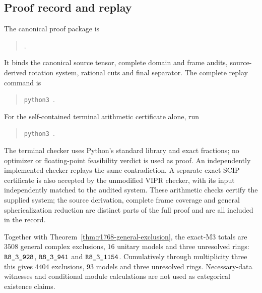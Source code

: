 \subsection{Proof record and replay}
The canonical proof package is
\begin{quote}\small{}.\end{quote}
It binds the canonical source tensor, complete domain and frame audits,
source-derived rotation system, rational cuts and final separator.
The complete replay command is
\begin{quote}\small
\texttt{python3 }.
\end{quote}
For the self-contained terminal arithmetic certificate alone, run
\begin{quote}\small
\texttt{python3 }.
\end{quote}
The terminal checker uses Python's standard library and exact fractions;
no optimizer or floating-point feasibility verdict is used as proof.
An independently implemented checker replays the same contradiction.
A separate exact SCIP certificate is also accepted by the unmodified
VIPR checker, with its input independently matched to the audited system.
These arithmetic checks certify the supplied system; the source derivation,
complete frame coverage and general sphericalization reduction are distinct
parts of the full proof and are all included in the record.

Together with Theorem~\ref{thm:r1768-general-exclusion}, the exact-M3 totals are
$3508$ general complex exclusions, $16$ unitary models and three unresolved
rings: $\sha{R8_3_928}$, $\sha{R8_3_941}$ and $\sha{R8_3_1154}$.
Cumulatively through multiplicity three this gives $4404$ exclusions,
$93$ models and three unresolved rings. Necessary-data witnesses and conditional module calculations are not
used as categorical existence claims.

